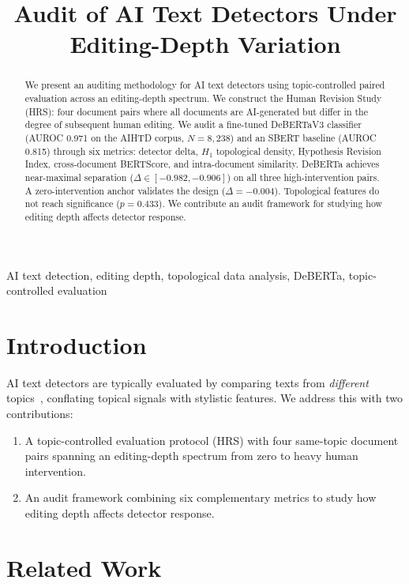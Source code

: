 \documentclass[conference]{IEEEtran}
\title{Audit of AI Text Detectors Under Editing-Depth Variation}
\author{
\IEEEauthorblockN{Sid}
\IEEEauthorblockA{
Manipal Institute of Technology\\
Manipal, India}
}
\begin{document}
\maketitle

\begin{abstract}
We present an auditing methodology for AI text detectors using topic-controlled paired evaluation across an editing-depth spectrum. We construct the Human Revision Study (HRS): four document pairs where all documents are AI-generated but differ in the degree of subsequent human editing. We audit a fine-tuned DeBERTaV3 classifier (AUROC 0.971 on the AIHTD corpus, $N = 8{,}238$) and an SBERT baseline (AUROC 0.815) through six metrics: detector delta, $H_1$ topological density, Hypothesis Revision Index, cross-document BERTScore, and intra-document similarity. DeBERTa achieves near-maximal separation ($\Delta \in [-0.982, -0.906]$) on all three high-intervention pairs. A zero-intervention anchor validates the design ($\Delta = -0.004$). Topological features do not reach significance ($p = 0.433$). We contribute an audit framework for studying how editing depth affects detector response.
\end{abstract}

\begin{IEEEkeywords}
AI text detection, editing depth, topological data analysis, DeBERTa, topic-controlled evaluation
\end{IEEEkeywords}

\section{Introduction}

AI text detectors are typically evaluated by comparing texts from \textit{different} topics~\cite{wang2024m4}, conflating topical signals with stylistic features. We address this with two contributions:

\begin{enumerate}
    \item A topic-controlled evaluation protocol (HRS) with four same-topic document pairs spanning an editing-depth spectrum from zero to heavy human intervention.
    \item An audit framework combining six complementary metrics to study how editing depth affects detector response.
\end{enumerate}

\section{Related Work}
\end{document}
